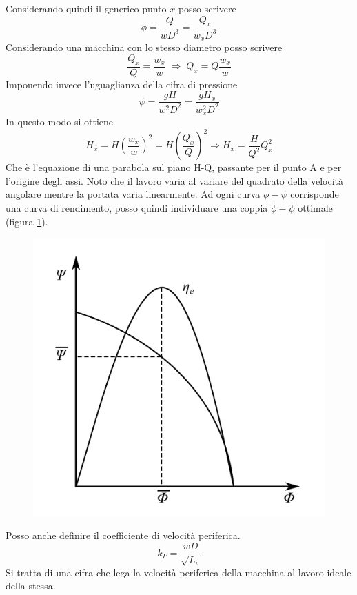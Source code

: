 Considerando quindi il generico punto $x$ posso scrivere
\begin{equation}
\phi = \frac{Q}{w D^3}= \frac{Q_x}{w_x D^3}
\end{equation}
Considerando una macchina con lo stesso diametro posso scrivere
\begin{equation}
\frac{Q_x}{Q}=\frac{w_x}{w} \; \Rightarrow \; Q_x = Q \frac{w_x}{w}
\end{equation}
Imponendo invece l'uguaglianza della cifra di pressione
\begin{equation}
\psi = \frac{gH}{w^2 D^2}= \frac{gH_x}{w_x^2 D^2}
\end{equation}
In questo modo si ottiene
\begin{equation}
H_x = H(\frac{w_x}{w})^2 = H(\frac{Q_x}{Q})^2 \Rightarrow H_x = \frac{H}{Q^2}Q_x^2
\end{equation}
Che è l'equazione di una parabola sul piano H-Q, passante per il punto A e per l'origine degli assi. 
Noto che il lavoro varia al variare del quadrato della velocità angolare mentre la portata varia linearmente. 
Ad ogni curva $\phi - \psi$ corrisponde una curva di rendimento, posso quindi individuare una coppia $\bar{\phi} - \bar{\psi}$ ottimale (figura \ref{fig:adim}).
\begin{figure}[h!]
\centering
  \includegraphics[width=.3\textwidth]{fig/adim.pdf}
\caption{}
\label{fig:adim}
\end{figure}
Posso anche definire il coefficiente di velocità periferica.
\begin{equation}
k_P = \frac{w D}{\sqrt{L_i}}
\end{equation}
Si tratta di una cifra che lega la velocità periferica della macchina al lavoro ideale della stessa.


